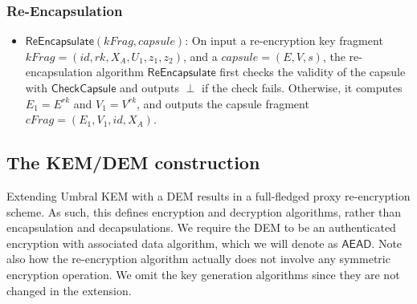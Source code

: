 \documentclass{amsart}
\begin{document}
\subsubsection{Re-Encapsulation}%

\begin{itemize}
\item $\mathsf{ReEncapsulate}(kFrag, capsule)$: On input a re-encryption key fragment $kFrag= (id, rk, X_A, U_1, z_1, z_2)$, and a $capsule = (E,V,s)$, the re-encapsulation algorithm $\mathsf{ReEncapsulate}$ first checks the validity of the capsule with $\mathsf{CheckCapsule}$ and outputs $\perp$ if the check fails. Otherwise, it computes $E_1 = E^{rk}$ and $V_1 = V^{rk}$, and outputs the capsule fragment $cFrag = (E_1, V_1, id, X_A)$. 




\end{itemize}

		

\subsection{The KEM/DEM construction}

Extending Umbral KEM with a DEM results in a full-fledged proxy re-encryption scheme. As such, this defines encryption and decryption algorithms, rather than encapsulation and decapsulations. We require the DEM to be an authenticated encryption with associated data algorithm, which we will denote as $\mathsf{AEAD}$. Note also how the re-encryption algorithm actually does not involve any symmetric encryption operation. We omit the key generation algorithms since they are not changed in the extension. 
\end{document}
